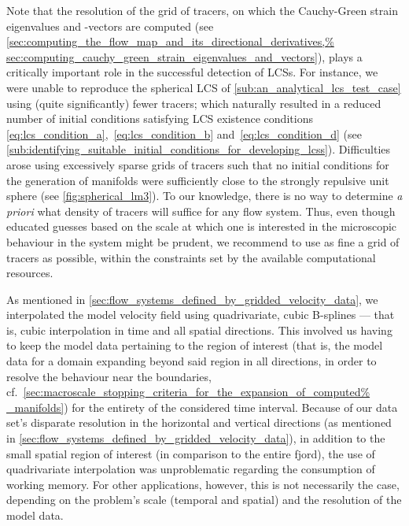 Note that the resolution of the grid of tracers, on which the Cauchy-Green
strain eigenvalues and -vectors are computed (see
\cref{sec:computing_the_flow_map_and_its_directional_derivatives,%
sec:computing_cauchy_green_strain_eigenvalues_and_vectors}), plays a critically
important role in the successful detection of LCSs. For instance, we were
unable to reproduce the spherical LCS of \cref{sub:an_analytical_lcs_test_case}
using (quite significantly) fewer tracers; which naturally resulted in a
reduced number of initial conditions satisfying LCS existence conditions~
\eqref{eq:lcs_condition_a},~\eqref{eq:lcs_condition_b}
and~\eqref{eq:lcs_condition_d} (see
\cref{sub:identifying_suitable_initial_conditions_for_developing_lcss}).
Difficulties arose using excessively sparse grids of tracers such that no
initial conditions for the generation of manifolds were sufficiently close to
the strongly repulsive unit sphere (see \cref{fig:spherical_lm3}). To our
knowledge, there is no way to determine \emph{a priori} what density of tracers
will suffice for any flow system. Thus, even though educated guesses based on
the scale at which one is interested in the microscopic behaviour in the system
might be prudent, we recommend to use as fine a grid of tracers as possible,
within the constraints set by the available computational resources.

As mentioned in \cref{sec:flow_systems_defined_by_gridded_velocity_data}, we
interpolated the model velocity field using quadrivariate, cubic B-splines ---
that is, cubic interpolation in time and all spatial directions. This involved
us having to keep the model data pertaining to the region of interest (that is,
the model data for a domain expanding beyond said region in all directions, in
order to resolve the behaviour near the boundaries, cf.\
\cref{sec:macroscale_stopping_criteria_for_the_expansion_of_computed%
_manifolds}) for the entirety of the considered time interval. Because of our
data set's disparate resolution in the horizontal and vertical directions
(as mentioned in \cref{sec:flow_systems_defined_by_gridded_velocity_data}), in
addition to the small spatial region of interest (in comparison to the entire
fjord), the use of quadrivariate interpolation was unproblematic regarding
the consumption of working memory. For other applications, however, this is not
necessarily the case, depending on the problem's scale (temporal and spatial)
and the resolution of the model data.


